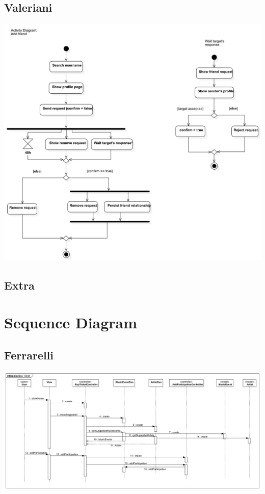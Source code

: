 \documentclass[11pt,a4paper]{article}
\begin{document}
\subsection{Valeriani}
\includegraphics[scale=0.4]{ADValeriani.jpg}
\subsection{Extra}
\section{Sequence Diagram}
\subsection{Ferrarelli}
\includegraphics[scale=0.4]{SQFerrarelli.jpg}
\end{document}
